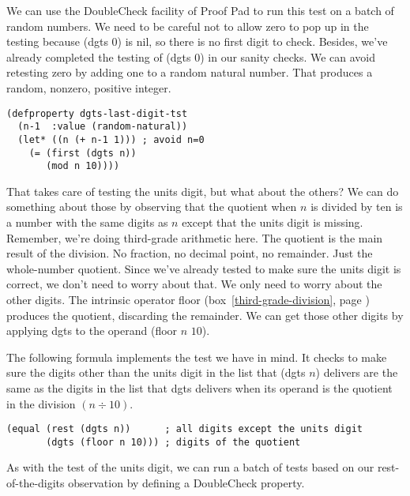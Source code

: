 We can use the DoubleCheck facility of Proof Pad to run this test on a batch of random numbers.
We need to be careful not to allow zero to pop up in the testing
because \textsf{(dgts 0)} is nil, so there is no first digit to check.
Besides, we've already completed the testing of \textsf{(dgts 0)} in our sanity checks.
We can avoid retesting zero by adding one to a random natural number.
That produces a random, nonzero, positive integer.
\begin{code}
\begin{verbatim}
(defproperty dgts-last-digit-tst
  (n-1  :value (random-natural))
  (let* ((n (+ n-1 1))) ; avoid n=0
    (= (first (dgts n))
       (mod n 10))))
\end{verbatim}
\end{code}

That takes care of testing the units digit, but what about the others?
We can do something about those by observing that the quotient
when $n$ is divided by ten
is a number with the same digits as $n$
except that the units digit is missing.
Remember, we're doing third-grade arithmetic here.
The quotient is the main result of the division.
No fraction, no decimal point, no remainder. Just the whole-number quotient.
Since we've already tested to make sure the units digit is correct,
we don't need to worry about that.
We only need to worry about the other digits.
The intrinsic operator \textsf{floor}
(box~\ref{third-grade-division}, page \pageref{third-grade-division})
produces the quotient, discarding the remainder.
We can get those other digits by applying \textsf{dgts} to
the operand \textsf{(floor $n$ $10$)}.

The following formula implements the test we have in mind.
It checks to make sure the digits other than the units digit
in the list that \textsf{(dgts $n$)} delivers
are the same as the digits in the list that
\textsf{dgts} delivers when its operand is the quotient in
the division $(n \div 10)$.
\begin{code}
\begin{verbatim}
(equal (rest (dgts n))      ; all digits except the units digit
       (dgts (floor n 10))) ; digits of the quotient
\end{verbatim}
\end{code}

As with the test of the units digit,
we can run a batch of tests based on
our rest-of-the-digits observation by defining a DoubleCheck property.


